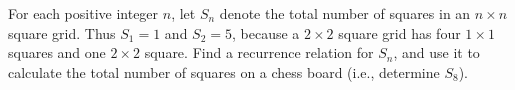 For each positive integer $n$, let $S_n$ denote the total number of squares in
an $n \times n$ square grid. Thus $S_1 = 1$ and $S_2 = 5$, because a $2 \times
2$ square grid has four $1 \times 1$ squares and one $2 \times 2$ square. Find
a recurrence relation for $S_n$, and use it to calculate the total number of
squares on a chess board (i.e., determine $S_8$).
